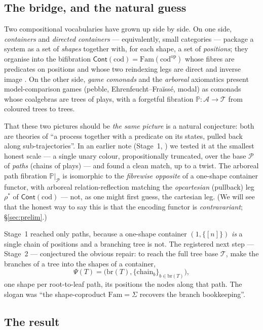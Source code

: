 \documentclass[11pt]{article}
\theoremstyle{definition}
\newcommand{\Cont}{\mathsf{Cont}}
\newcommand{\Fam}{\mathrm{Fam}}
\newcommand{\cod}{\mathrm{cod}}
\newcommand{\branches}{\mathrm{br}}
\newcommand{\op}{\mathrm{op}}
\newcommand{\Tree}{\mathcal{T}}
\newcommand{\Path}{\mathcal{P}}
\newcommand{\Arb}{\mathcal{A}}
\newcommand{\Pfib}{\mathbb{P}}
\begin{document}
\subsection*{The bridge, and the natural guess}

Two compositional vocabularies have grown up side by side. On one side, \emph{containers} and
\emph{directed containers} --- equivalently, small categories \cite{ahman-dcont-cat} --- package a
system as a set of \emph{shapes} together with, for each shape, a set of \emph{positions}; they
organise into the bifibration $\Cont(\cod)=\Fam(\cod^\op)$ whose fibres are predicates on positions
and whose two reindexing legs are direct and inverse image \cite{macbeth-contcod}. On the other
side, \emph{game comonads} and the \emph{arboreal} axiomatics \cite{arboreal-axioms} present
model-comparison games (pebble, Ehrenfeucht--Fra\"iss\'e, modal) as comonads whose coalgebras are
trees of plays, with a forgetful fibration $\Pfib\colon\Arb\to\Tree$ from coloured trees to trees.

That these two pictures should be \emph{the same picture} is a natural conjecture: both are theories
of ``a process together with a predicate on its states, pulled back along sub-trajectories''. In an
earlier note (Stage~1, \cite{macbeth-stage1}) we tested it at the smallest honest scale --- a single
unary colour, propositionally truncated, over the base $\Path$ of \emph{paths} (chains of plays) ---
and found a clean match, up to a twist. The arboreal path fibration $\Pfib|_\Path$ is isomorphic to
the \emph{fibrewise opposite} of a one-shape container functor, with arboreal relation-reflection
matching the \emph{opcartesian} (pullback) leg $\rho^*$ of $\Cont(\cod)$ --- not, as one might first
guess, the cartesian leg. (We will see that the honest way to say this is that the encoding functor
is \emph{contravariant}; \S\ref{sec:prelim}.)

Stage~1 reached only paths, because a one-shape container $(1,\{[n]\})$ \emph{is} a single chain of
positions and a branching tree is not. The registered next step --- Stage~2 --- conjectured the
obvious repair: to reach the full tree base $\Tree$, make the branches of a tree into the shapes of
a container,
\[
\Psi(T)=\bigl(\branches(T),\{\mathrm{chain}_b\}_{b\in\branches(T)}\bigr),
\]
one shape per root-to-leaf path, its positions the nodes along that path. The slogan was ``the
shape-coproduct $\Fam=\Sigma$ recovers the branch bookkeeping''.

\subsection*{The result}
\end{document}
